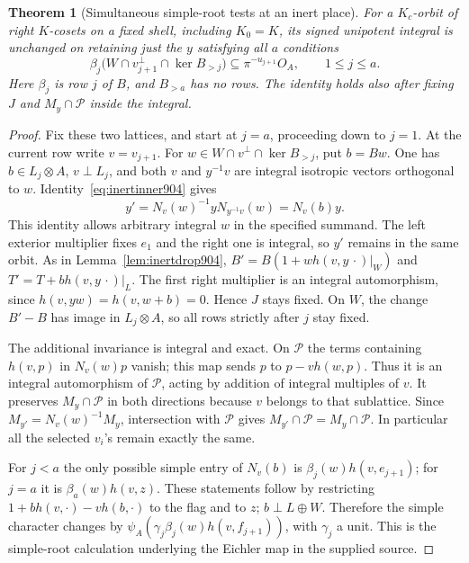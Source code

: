 \documentclass[a4paper,11pt]{article}
\newtheorem{theorem}[proposition]{Theorem}
\theoremstyle{definition}
\theoremstyle{remark}
\numberwithin{equation}{section}
\begin{document}
\begin{theorem}[Simultaneous simple-root tests at an inert place]
\leavevmode\label{thm:inertjoint907}
For a \(K_c\)-orbit of right \(K\)-cosets on a fixed shell,
including \(K_0=K\), its signed unipotent integral is unchanged
on retaining just the \(y\) satisfying all \(a\) conditions
\begin{equation}
     \beta_j\big(W\cap v_{j+1}^\perp\cap\ker B_{>j}\big)
                               \subseteq \pi^{-u_{j+1}}O_A,
                 \qquad 1\le j\le a .
 \label{eq:inertjoint907}
\end{equation}
Here \(\beta_j\) is row \(j\) of \(B\), and \(B_{>a}\) has no
rows. The identity holds also after fixing \(J\) and
\(M_y\cap\mathcal P\) inside the integral.
\end{theorem}
\begin{proof}
Fix these two lattices, and start at \(j=a\), proceeding down
to \(j=1\). At the current row write \(v=v_{j+1}\).
For \(w\in W\cap v^\perp\cap\ker B_{>j}\), put \(b=Bw\).
One has \(b\in L_j\otimes A\), \(v\perp L_j\), and both \(v\)
and \(y^{-1}v\) are integral isotropic vectors orthogonal to \(w\).
Identity~\eqref{eq:inertinner904} gives
\[
              y'=N_v(w)^{-1} y N_{y^{-1}v}(w)=N_v(b)y .
\]
This identity allows arbitrary integral \(w\) in the specified
summand. The left exterior multiplier fixes \(e_1\) and the
right one is integral, so \(y'\) remains in the same orbit.
As in Lemma~\ref{lem:inertdrop904}, \(B'=B(1+w h(v,y\,\cdot)|_W)\)
and \(T'=T+b h(v,y\,\cdot)|_L\). The first right multiplier is
an integral automorphism, since \(h(v,yw)=h(v,w+b)=0\).
Hence \(J\) stays fixed. On \(W\), the change \(B'-B\) has
image in \(L_j\otimes A\), so all rows strictly after \(j\)
stay fixed.

The additional invariance is integral and exact. On
\(\mathcal P\) the terms containing \(h(v,p)\) in \(N_v(w)p\)
vanish; this map sends \(p\) to \(p-vh(w,p)\). Thus it is an
integral automorphism of \(\mathcal P\), acting by addition of
integral multiples of \(v\). It preserves \(M_y\cap\mathcal P\)
in both directions because \(v\) belongs to that sublattice.
Since \(M_{y'}=N_v(w)^{-1}M_y\), intersection with \(\mathcal P\)
gives \(M_{y'}\cap\mathcal P=M_y\cap\mathcal P\).
In particular all the selected \(v_i\)'s remain exactly the same.

For \(j<a\) the only possible simple entry of \(N_v(b)\)
is \(\beta_j(w)h(v,e_{j+1})\); for \(j=a\) it is
\(\beta_a(w)h(v,z)\). These statements follow by restricting
\(1+b h(v,\cdot)-v h(b,\cdot)\) to the flag and to \(z\);
\(b\perp L\oplus W\). Therefore the simple character changes
by \(\psi_A(\gamma_j\beta_j(w)h(v,f_{j+1}))\), with
\(\gamma_j\) a unit. This is the simple-root calculation
underlying the Eichler map in the supplied source.


\end{proof}
\end{document}
